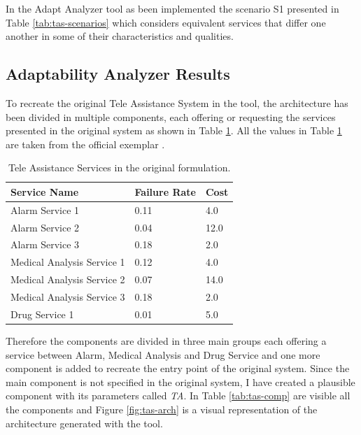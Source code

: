 In the Adapt Analyzer tool as been implemented the scenario S1 presented in Table \ref{tab:tas-scenarios} which considers equivalent services that differ one another in some of their characteristics and qualities.

\clearpage

\subsection{Adaptability Analyzer Results}

To recreate the original Tele Assistance System in the tool, the architecture has been divided in multiple components, each offering or requesting the services presented in the original system as shown in Table \ref{tab:tas-original-services}. All the values in Table \ref{tab:tas-original-services} are taken from the official exemplar \cite{teleassist}.

\begin{table}[ht!b]
	\centering
	\begin{tabular}{|p{5cm}|p{3cm}|p{1cm}|}
		\hline 
		\textbf{Service Name} & \textbf{Failure Rate} & \textbf{Cost} \\ 
		\hline 
		Alarm Service 1 & 0.11 & 4.0 \\
		\hline 
		Alarm Service 2 & 0.04 & 12.0 \\ 
		\hline 
		Alarm Service 3 & 0.18 & 2.0 \\ 
		\hline 
		Medical Analysis Service 1 & 0.12 & 4.0 \\ 
		\hline
		Medical Analysis Service 2 & 0.07 & 14.0 \\ 
		\hline
		Medical Analysis Service 3 & 0.18 & 2.0 \\ 
		\hline
		Drug Service 1 & 0.01 & 5.0 \\ 
		\hline
		
	\end{tabular} 
	\caption[TAS Services]{Tele Assistance Services in the original formulation.}
	\label{tab:tas-original-services}
\end{table}

Therefore the components are divided in three main groups each offering a service between Alarm, Medical Analysis and Drug Service and one more component is added to recreate the entry point of the original system. Since the main component is not specified in the original system, I have created a plausible component with its parameters called \emph{TA}. In Table \ref{tab:tas-comp} are visible all the components and Figure \ref{fig:tas-arch} is a visual representation of the architecture generated with the tool.

